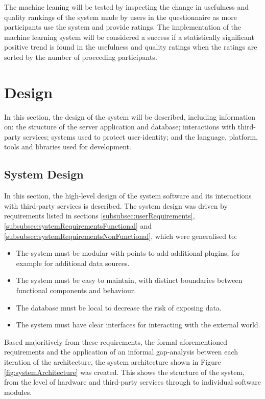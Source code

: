 \documentclass[authoryearcitations]{UoYCSproject}
\begin{document}
The machine leaning will be tested by inspecting the change in usefulness and quality rankings of the system made by users in the questionnaire as more participants use the system and provide ratings. The implementation of the machine learning system will be considered a success if a statistically significant positive trend is found in the usefulness and quality ratings when the ratings are sorted by the number of proceeding participants.

\newpage
\chapter{Design}
\label{sec:design}
In this section, the design of the system will be described, including information on: the structure of the server application and database; interactions with third-party services; systems used to protect user-identity; and the language, platform, tools and libraries used for development.

\section{System Design}
In this section, the high-level design of the system software and its interactions with third-party services is described.  The system design was driven by requirements listed in sections \ref{subsubsec:userRequirements}, \ref{subsubsec:systemRequirementsFunctional} and \ref{subsubsec:systemRequirementsNonFunctional}, which were generalised to:

\begin{itemize}
    \item The system must be modular with points to add additional plugins, for example for additional data sources.
    \item The system must be easy to maintain, with distinct boundaries between functional components and behaviour.
    \item The database must be local to decrease the risk of exposing data.
    \item The system must have clear interfaces for interacting with the external world.
\end{itemize}

Based majoritively from these requirements, the formal aforementioned requirements and the application of an informal gap-analysis between each iteration of the architecture, the system architecture shown in Figure \ref{fig:systemArchitecture} was created.  This shows the structure of the system, from the level of hardware and third-party services through to individual software modules.
\end{document}
